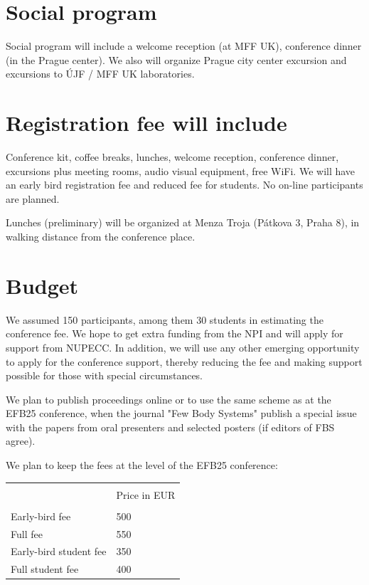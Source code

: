 \documentclass[12pt]{extarticle}
\begin{document}
\section*{Social program}
\noindent
Social program will include a welcome reception (at MFF UK), conference dinner (in the Prague center). 
We also will organize Prague city center excursion and excursions to ÚJF / MFF UK laboratories.

\section*{Registration fee will include}
\noindent
Conference kit, coffee breaks, lunches, welcome reception, conference dinner, excursions plus
meeting rooms,  audio visual equipment,  free WiFi. We will have an early bird registration fee and
reduced fee for students. No on-line participants are planned. 

Lunches (preliminary) will be organized at Menza Troja (Pátkova 3, Praha 8), in walking distance from
the conference place.



\section*{Budget}
\noindent
We assumed 150 participants, among them 30 students in estimating the conference fee.
We hope to get extra funding from the NPI and will apply for support from NUPECC.
In addition, we will use any other emerging opportunity to apply for the conference
support, thereby reducing the fee and making support possible for those with special circumstances.

We plan to publish proceedings online or to use the same scheme as at the EFB25 conference, when
the journal "Few Body Systems" publish a special issue with the papers from oral presenters and
selected posters (if editors of FBS agree).

%
We plan to keep the fees at the level of the EFB25 conference:
\begin{table}[h]
\centering
\begin{tabular}{ll}
\hline \\[-1mm]
 &   Price in EUR  \\[1mm]
\hline \\[-1mm]
 Early-bird fee & 500  \\[1mm]
 Full fee &  550 \\[1mm]
 Early-bird student fee & 350  \\[1mm]
 Full student fee &  400 \\[1mm]
\hline
\end{tabular}
\end{table}
\end{document}
